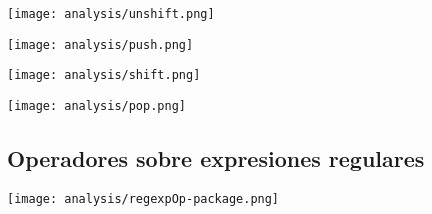 \begin{multicols}{2}
\begin{center}
\texttt{[image: analysis/unshift.png]} 
\end{center}
\columnbreak
\begin{center}
\texttt{[image: analysis/push.png]} 
\end{center}
\end{multicols}

\begin{multicols}{2}
\begin{center}
\texttt{[image: analysis/shift.png]} 
\end{center}
\columnbreak
\begin{center}
\texttt{[image: analysis/pop.png]} 
\end{center}
\end{multicols}


\subsection {Operadores sobre expresiones regulares}
\begin{center}
\texttt{[image: analysis/regexpOp-package.png]} 
\end{center}

